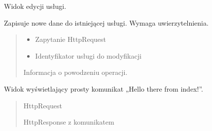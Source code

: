 \documentclass[letterpaper,10pt,polish]{sphinxmanual}
\begin{document}
\begin{fulllineitems}
\label{\detokenize{mainApp:mainApp.views.edit_service}}
\pysigstartsignatures
{}
\pysigstopsignatures
\sphinxAtStartPar
Widok edycji usługi.

\sphinxAtStartPar
Zapisuje nowe dane do istniejącej usługi.
Wymaga uwierzytelnienia.
\begin{quote}\begin{description}
\begin{itemize}
\item {} 
\sphinxAtStartPar
{} \textendash{} Zapytanie HttpRequest

\item {} 
\sphinxAtStartPar
{} \textendash{} Identyfikator usługi do modyfikacji

\end{itemize}

\sphinxAtStartPar
Informacja o powodzeniu operacji.

\end{description}\end{quote}

\end{fulllineitems}


\begin{fulllineitems}
\label{\detokenize{mainApp:mainApp.views.index}}
\pysigstartsignatures
{}
\pysigstopsignatures
\sphinxAtStartPar
Widok wyświetlający prosty komunikat „Hello there from index!”.
\begin{quote}\begin{description}
\sphinxAtStartPar
{} \textendash{} HttpRequest

\sphinxAtStartPar
HttpResponse z komunikatem

\end{description}\end{quote}

\end{fulllineitems}
\end{document}
